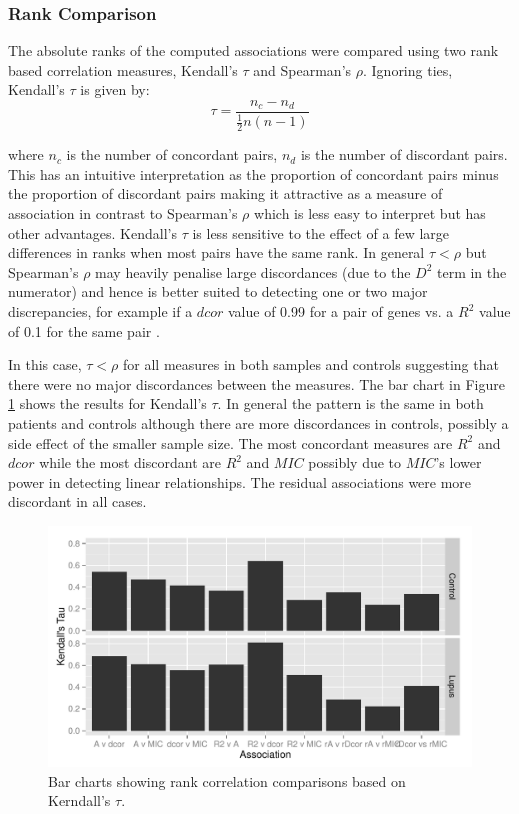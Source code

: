\documentclass[a4paper, 12pt]{report}
\begin{document}
\subsubsection{Rank Comparison}
The absolute ranks of the computed associations were compared using two rank based correlation measures, Kendall's $\tau$ and Spearman's $\rho$. Ignoring ties, Kendall's $\tau$ is given by:
\[
\tau = \frac{n_c - n_d}{\frac{1}{2}n(n-1)}
\]

where $n_c$ is the number of concordant pairs, $n_d$ is the number of discordant pairs. This has an intuitive interpretation as the proportion of concordant pairs minus the proportion of discordant pairs making it attractive as a measure of association in contrast to Spearman's $\rho$ which is less easy to interpret but has other advantages. Kendall's $\tau$ is less sensitive to the effect of a few large differences in ranks when most pairs have the same rank. In general $\tau < \rho$ but Spearman's $\rho$ may heavily penalise large discordances (due to the $D^2$ term in the numerator) and hence is better suited to detecting one or two major discrepancies, for example if a $dcor$ value of 0.99 for a pair of genes vs. a $R^2$ value of 0.1 for the same pair \cite{Kendall}. 

In this case, $\tau < \rho$ for all measures in both samples and controls suggesting that there were no major discordances between the measures. The bar chart in Figure \ref{F:kendall} shows the results  for Kendall's $\tau$. In general the pattern is the same in both patients and controls although there are more discordances in controls, possibly a side effect of the smaller sample size. The most concordant measures are $R^2$ and $dcor$ while the most discordant are $R^2$ and $MIC$ possibly due to $MIC$'s lower power in detecting linear relationships. The residual associations were more discordant in all cases.

\begin{figure}[H]
\begin{centering}
\includegraphics[width=\textwidth]{kendall2.pdf}
\caption{Bar charts showing rank correlation comparisons based on Kerndall's $\tau$.} 
\label{F:kendall}
\end{centering}
\end{figure}
\end{document}
